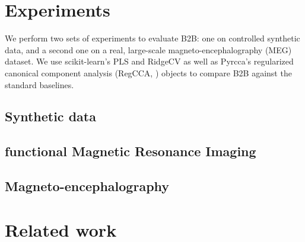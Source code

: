 \documentclass[preprint,12pt,3p]{elsarticle}
\begin{document}
\section{Experiments}

We perform two sets of experiments to evaluate B2B: one on controlled synthetic
data, and a second one on a real, large-scale magneto-encephalography (MEG)
dataset.
%
We use scikit-learn's PLS and RidgeCV \citep{sklearn} as well as Pyrcca's
regularized canonical component analysis (RegCCA, \citep{bilenko2016pyrcca})
objects to compare B2B against the standard baselines.

\subsection{Synthetic data}
\label{sec:experiment_synthetic}


\subsection{functional Magnetic Resonance Imaging}
\label{sec:experiment_fmri}


\subsection{Magneto-encephalography}
\label{sec:experiment_real}


\section{Related work}

\end{document}
